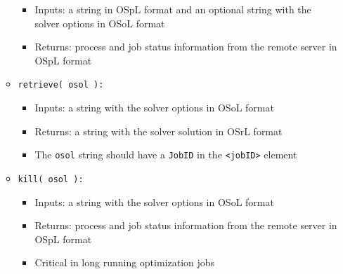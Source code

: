 \documentclass[11pt]{article}
\renewcommand{\_}{{\char"5F}}
\renewcommand{\{}{{\char"7B}}
\renewcommand{\}}{{\char"7D}}
\renewcommand{\^}{{\char"0D}}
\renewcommand{\'}{{\char"0D}}
\begin{document}
\begin{enumerate}[Step 1:]
\begin{itemize}
\begin{itemize}

\item Inputs: a string in OSpL format and an optional string with the solver options in OSoL format

\item Returns: process and job status information from the remote server in OSpL format

\end{itemize}


\item {\tt retrieve( osol ):}

\begin{itemize}

\item Inputs: a string with the solver options  in OSoL format

\item Returns: a string with the solver solution in OSrL format

\item The {\tt osol} string should have a {\tt JobID} in the {\tt <jobID>} element

\end{itemize}


\item {\tt kill( osol ):}

\begin{itemize}

\item Inputs: a string with the solver options  in OSoL format

\item Returns: process and job status information from the remote server in OSpL format

\item Critical in long running optimization jobs

\end{itemize}

\end{itemize}



\end{enumerate}
\end{document}
